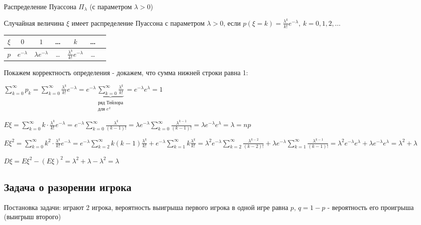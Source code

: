 \documentclass[12pt]{article}
\begin{document}
    \hypertarget{poissondistribution}{}

    Распределение Пуассона $\Pi_\lambda$ (с параметром $\lambda > 0$)

    \Def Случайная величина $\xi$ имеет распределение Пуассона с параметром $\lambda > 0$, если $p(\xi = k) = \frac{\lambda^k}{k!}e^{-\lambda}, \ k = 0, 1, 2, \dots$

    \smallvspace

    \begin{tabular}{c|c|c|c|c|c|c}
        $\xi$ & $0$ & $1$ & \dots & $k$ & \dots   \\
        \hline
        $p$   & $e^{-\lambda}$ & $\lambda e^{-\lambda}$ & \dots & $\frac{\lambda^k}{k!}e^{-\lambda}$ & \dots 
    \end{tabular}

    \smallvspace

    Покажем корректность определения - докажем, что сумма нижней строки равна 1:

    $\sum_{k = 0}^\infty p_k = \sum_{k = 0}^\infty \frac{\lambda^k}{k!} e^{-\lambda} = e^{-\lambda} \underset{\substack{\text{ряд Тейлора}\\ \text{для } e^x}}{\underbrace{\sum_{k = 0}^\infty \frac{\lambda^k}{k!}}} = e^{-\lambda} e^\lambda = 1$

    $E\xi = \sum_{k = 0}^\infty k \cdot \frac{\lambda^k}{k!}e^{-\lambda} = e^{-\lambda} \sum_{k = 0}^\infty \frac{\lambda^k}{(k - 1)!} = 
    \lambda e^{-\lambda} \sum_{k = 0}^\infty \frac{\lambda^{k - 1}}{(k - 1)!} = \lambda e^{-\lambda} e^\lambda = \lambda = np$

    
    $E\xi^2 = \sum_{k = 0}^\infty k^2 \cdot \frac{\lambda^k}{k!}e^{-\lambda} = e^{-\lambda} \sum_{k = 2}^\infty k(k - 1) \frac{\lambda^k}{k!} + 
    e^{-\lambda} \sum_{k = 1}^\infty k \frac{\lambda^k}{k!} = \lambda^2 e^{-\lambda} \sum_{k = 2}^\infty \frac{\lambda^{k - 2}}{(k - 2)!} + 
    \lambda e^{-\lambda} \sum_{k = 1}^\infty \frac{\lambda^{k - 1}}{(k - 1)!} = \lambda^2 e^{-\lambda} e^\lambda + \lambda e^{-\lambda} e^\lambda = \lambda^2 + \lambda$

    $D\xi = E\xi^2 - (E\xi)^2 = \lambda^2 + \lambda - \lambda^2 = \lambda$

    \clearpage

    \subsection{Задача о разорении игрока}

    Постановка задачи: играют 2 игрока, вероятность выигрыша первого игрока в одной игре равна $p$, $q = 1 - p$ - вероятность его проигрыша (выигрыш второго)
\end{document}

